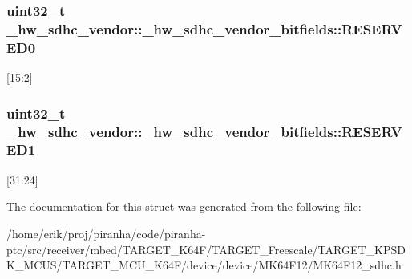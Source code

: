 \subsubsection[{\texorpdfstring{R\+E\+S\+E\+R\+V\+E\+D0}{RESERVED0}}]{\setlength{\rightskip}{0pt plus 5cm}uint32\+\_\+t \+\_\+hw\+\_\+sdhc\+\_\+vendor\+::\+\_\+hw\+\_\+sdhc\+\_\+vendor\+\_\+bitfields\+::\+R\+E\+S\+E\+R\+V\+E\+D0}\hypertarget{struct__hw__sdhc__vendor_1_1__hw__sdhc__vendor__bitfields_ad3046b8ebe71a9d2a254b8d7cbdd5a11}{}\label{struct__hw__sdhc__vendor_1_1__hw__sdhc__vendor__bitfields_ad3046b8ebe71a9d2a254b8d7cbdd5a11}
\mbox{[}15\+:2\mbox{]} 
\subsubsection[{\texorpdfstring{R\+E\+S\+E\+R\+V\+E\+D1}{RESERVED1}}]{\setlength{\rightskip}{0pt plus 5cm}uint32\+\_\+t \+\_\+hw\+\_\+sdhc\+\_\+vendor\+::\+\_\+hw\+\_\+sdhc\+\_\+vendor\+\_\+bitfields\+::\+R\+E\+S\+E\+R\+V\+E\+D1}\hypertarget{struct__hw__sdhc__vendor_1_1__hw__sdhc__vendor__bitfields_a9cbd6f0785c34a126a3ca01298ad6c17}{}\label{struct__hw__sdhc__vendor_1_1__hw__sdhc__vendor__bitfields_a9cbd6f0785c34a126a3ca01298ad6c17}
\mbox{[}31\+:24\mbox{]} 

The documentation for this struct was generated from the following file\+:\begin{DoxyCompactItemize}
\item 
/home/erik/proj/piranha/code/piranha-\/ptc/src/receiver/mbed/\+T\+A\+R\+G\+E\+T\+\_\+\+K64\+F/\+T\+A\+R\+G\+E\+T\+\_\+\+Freescale/\+T\+A\+R\+G\+E\+T\+\_\+\+K\+P\+S\+D\+K\+\_\+\+M\+C\+U\+S/\+T\+A\+R\+G\+E\+T\+\_\+\+M\+C\+U\+\_\+\+K64\+F/device/device/\+M\+K64\+F12/M\+K64\+F12\+\_\+sdhc.\+h\end{DoxyCompactItemize}
